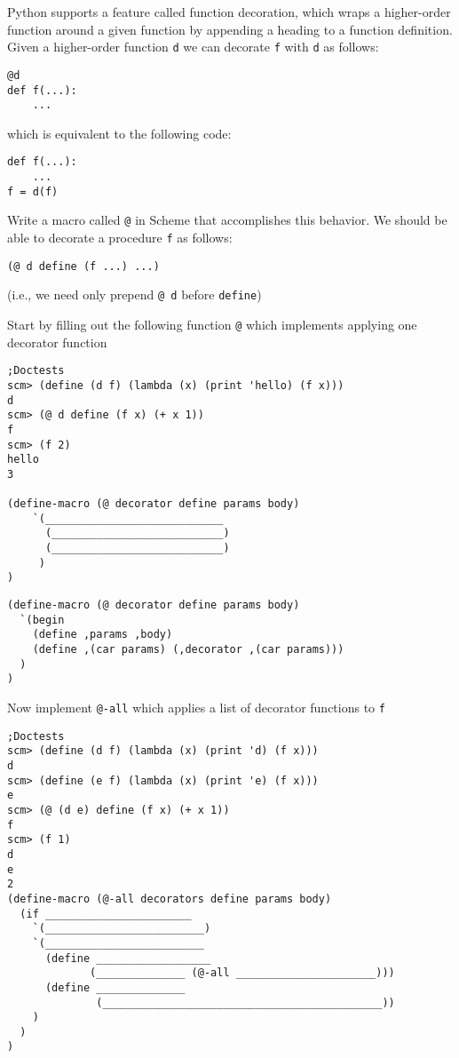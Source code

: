 \begin{blocksection}
\question Python supports a feature called function decoration, which wraps a higher-order function around a given function by appending a heading to a function definition. Given a higher-order function \lstinline{d} we can decorate \lstinline{f} with \lstinline{d} as follows:
\begin{lstlisting}
@d
def f(...):
    ...
\end{lstlisting}

which is equivalent to the following code:

\begin{lstlisting}
def f(...):
    ...
f = d(f)
\end{lstlisting}

Write a macro called \lstinline{@} in Scheme that accomplishes this behavior. We should be able to decorate a procedure \lstinline{f} as follows:

\begin{lstlisting}
(@ d define (f ...) ...)
\end{lstlisting}

(i.e., we need only prepend \lstinline{@ d} before \lstinline{define})

Start by filling out the following function \lstinline{@} which implements applying one decorator function

\begin{lstlisting}
;Doctests
scm> (define (d f) (lambda (x) (print 'hello) (f x)))
d
scm> (@ d define (f x) (+ x 1))
f
scm> (f 2)
hello
3

(define-macro (@ decorator define params body) 
    `(____________________________
      (___________________________)
      (___________________________)
     )
)
\end{lstlisting}
\end{blocksection}

\begin{blocksection}
\begin{solution}
\begin{lstlisting}
(define-macro (@ decorator define params body) 
  `(begin 
    (define ,params ,body)
    (define ,(car params) (,decorator ,(car params)))
  )
)
\end{lstlisting}
\end{solution}
\end{blocksection}

\begin{blocksection}
Now implement \lstinline{@-all} which applies a list of decorator functions to \lstinline{f}
\begin{lstlisting}
;Doctests
scm> (define (d f) (lambda (x) (print 'd) (f x)))
d
scm> (define (e f) (lambda (x) (print 'e) (f x)))
e
scm> (@ (d e) define (f x) (+ x 1))
f
scm> (f 1)
d
e
2
(define-macro (@-all decorators define params body)
  (if _______________________
    `(_________________________)
    `(_________________________
      (define __________________
             (______________ (@-all ______________________)))
      (define ______________ 
              (____________________________________________))
    )
  )
)
\end{lstlisting}
\end{blocksection}

